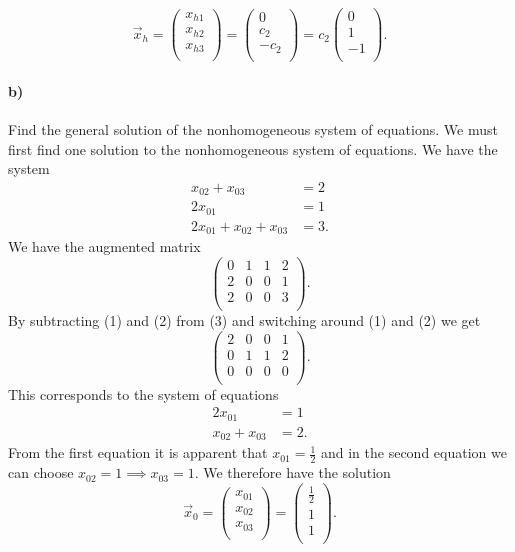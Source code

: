\[ 
\Vec{x}_h = \begin{pmatrix}
x_{h1}\\
x_{h2}\\
x_{h3}\\
\end{pmatrix} = \begin{pmatrix}
0\\
c_2\\
-c_2\\
\end{pmatrix} = c_2 \begin{pmatrix}
0\\
1\\
-1\\
\end{pmatrix}
.\]


\paragraph{b)} Find the general solution of the nonhomogeneous system of equations.
\bigbreak
We must first find one solution to the nonhomogeneous system of equations. We have the system
\begin{align*}
  x_{02} + x_{03} &= 2 \\
  2x_{01} &= 1 \\
  2x_{01} + x_{02} + x_{03} &= 3
.\end{align*}
We have the augmented matrix
\[ 
\left( \begin{array}{ccc|c}
0 & 1 & 1 & 2\\
2 & 0 & 0 & 1\\
2 & 0 & 0 & 3\\
\end{array} \right)
.\]
By subtracting (1) and (2) from (3) and switching around (1) and (2) we get
\[ 
\left( \begin{array}{ccc|c}
2 & 0 & 0 & 1\\
0 & 1 & 1 & 2\\
0 & 0 & 0 & 0\\
\end{array} \right)
.\]
This corresponds to the system of equations
\begin{align*}
  2x_{01} &= 1 \\
  x_{02} + x_{03} &= 2
.\end{align*}
From the first equation it is apparent that $x_{01} = \frac{1}{2}$ and in the second equation we can choose $x_{02} = 1 \implies x_{03} = 1$. We therefore have the solution
\[ 
\Vec{x}_0 = \begin{pmatrix}
x_{01}\\
x_{02}\\
x_{03}\\
\end{pmatrix} = \begin{pmatrix}
\frac{1}{2}\\
1\\
1\\
\end{pmatrix}
.\]
